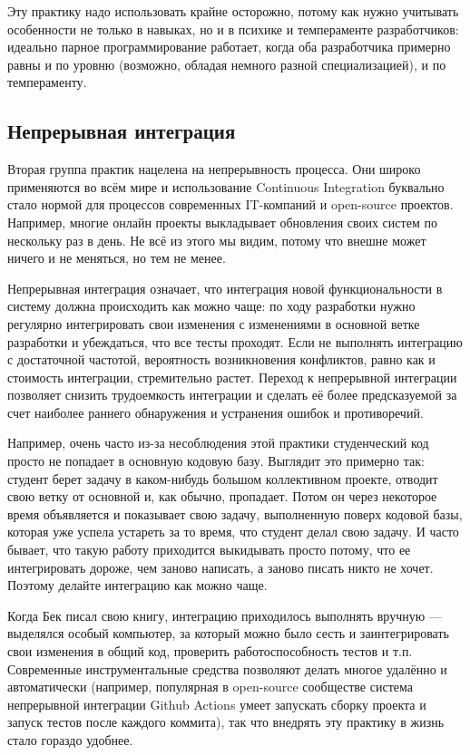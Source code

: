 \documentclass{../../text-style}
\begin{document}
Эту практику надо использовать крайне осторожно, потому как нужно учитывать особенности не только в навыках, но и в психике и темпераменте разработчиков: идеально парное программирование работает, когда оба разработчика примерно равны и по уровню (возможно, обладая немного разной специализацией), и по темпераменту.

\subsection{Непрерывная интеграция}

Вторая группа практик нацелена на непрерывность процесса. Они широко применяются во всём мире и использование Continuous Integration буквально стало нормой для процессов современных IT-компаний и open-source проектов. Например, многие онлайн проекты выкладывает обновления своих систем по нескольку раз в день. Не всё из этого мы видим, потому что внешне может ничего и не меняться, но тем не менее.

Непрерывная интеграция означает, что интеграция новой функциональности в систему должна происходить как можно чаще: по ходу разработки нужно регулярно интегрировать свои изменения с изменениями в основной ветке разработки и убеждаться, что все тесты проходят. Если не выполнять интеграцию с достаточной частотой, вероятность возникновения конфликтов, равно как и стоимость интеграции, стремительно растет. Переход к непрерывной интеграции позволяет снизить трудоемкость интеграции и сделать её более предсказуемой за счет наиболее раннего обнаружения и устранения ошибок и противоречий.

Например, очень часто из-за несоблюдения этой практики студенческий код просто не попадает в основную кодовую базу. Выглядит это примерно так: студент берет задачу в каком-нибудь большом коллективном проекте, отводит свою ветку от основной и, как обычно, пропадает. Потом он через некоторое время объявляется и показывает свою задачу, выполненную поверх кодовой базы, которая уже успела устареть за то время, что студент делал свою задачу. И часто бывает, что такую работу приходится выкидывать просто потому, что ее интегрировать дороже, чем заново написать, а заново писать никто не хочет. Поэтому делайте интеграцию как можно чаще.

Когда Бек писал свою книгу, интеграцию приходилось выполнять вручную --- выделялся особый компьютер, за который можно было сесть и заинтегрировать свои изменения в общий код, проверить работоспособность тестов и т.п. Современные инструментальные средства позволяют делать многое удалённо и автоматически (например, популярная в open-source сообществе система непрерывной интеграции Github Actions умеет запускать сборку проекта и запуск тестов после каждого коммита), так что внедрять эту практику в жизнь стало гораздо удобнее.
\end{document}
